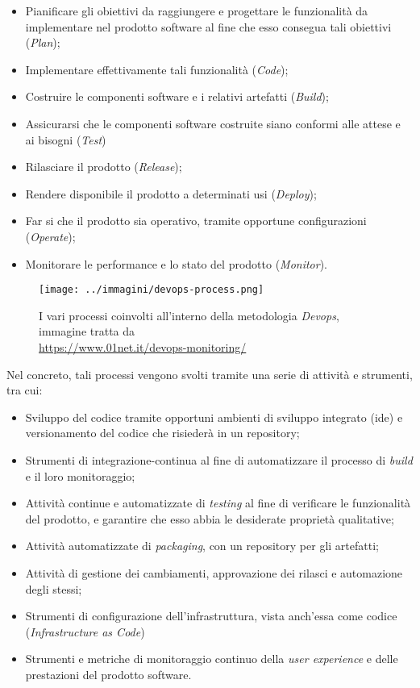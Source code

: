 \begin{itemize}
    \item Pianificare gli obiettivi da raggiungere e progettare le funzionalità da implementare nel prodotto software al fine che esso consegua tali obiettivi (\textit{Plan});
    \item Implementare effettivamente tali funzionalità (\textit{Code});
    \item Costruire le componenti software e i relativi artefatti (\textit{Build});
    \item Assicurarsi che le componenti software costruite siano conformi alle attese e ai bisogni (\textit{Test})
    \item Rilasciare il prodotto (\textit{Release});
    \item Rendere disponibile il prodotto a determinati usi (\textit{Deploy});
    \item Far si che il prodotto sia operativo, tramite opportune configurazioni (\textit{Operate});
    \item Monitorare le performance e lo stato del prodotto (\textit{Monitor}).
\end{itemize}

\begin{figure}[H]
    \capstart
    \centering
    \texttt{[image: ../immagini/devops-process.png]}
    \caption[I vari processi coinvolti all'interno della metodologia \textit{Devops}]{I vari processi coinvolti all'interno della metodologia \textit{Devops}, immagine tratta da \\ \url{https://www.01net.it/devops-monitoring/}}
\end{figure}

Nel concreto, tali processi vengono svolti tramite una serie di attività e strumenti, tra cui:

\begin{itemize}
    \item Sviluppo del codice tramite opportuni ambienti di sviluppo integrato (\gls{ide}) e versionamento del codice che risiederà in un \gls{repository};
    \item Strumenti di \gls{integrazione-continua} al fine di automatizzare il processo di \textit{\gls{build}} e il loro monitoraggio;
    \item Attività continue e automatizzate di \textit{testing} al fine di verificare le funzionalità del prodotto, e garantire che esso abbia le desiderate proprietà qualitative; 
    \item Attività automatizzate di \textit{packaging}, con un \gls{repository} per gli artefatti;
    \item Attività di gestione dei cambiamenti, approvazione dei rilasci e automazione degli stessi;
    \item Strumenti di configurazione dell'infrastruttura, vista anch'essa come codice (\textit{Infrastructure as Code})
    \item Strumenti e metriche di monitoraggio continuo della \textit{user experience} e delle prestazioni del prodotto software.
\end{itemize}

